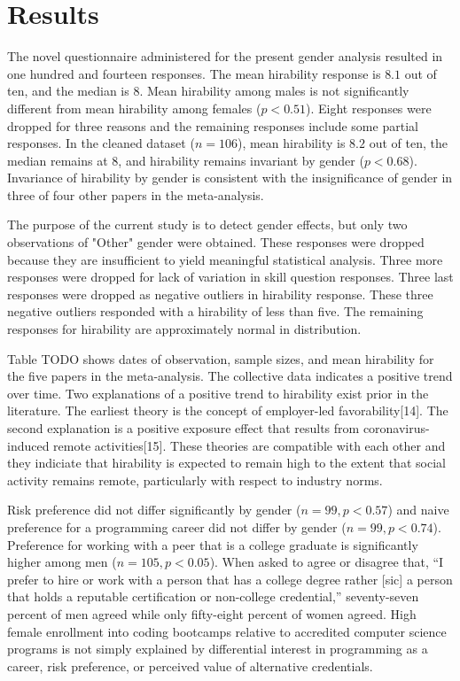 \documentclass[review]{elsarticle}
\begin{document}
\section{Results}

The novel questionnaire administered for the present gender analysis resulted in one hundred and fourteen responses.
The mean hirability response is $8.1$ out of ten, and the median is $8$.
Mean hirability among males is not significantly different from mean hirability among females ($p < 0.51$).
Eight responses were dropped for three reasons and the remaining responses include some partial responses.
In the cleaned dataset ($n = 106$), mean hirability is $8.2$ out of ten,
the median remains at $8$, and hirability remains invariant by gender ($p < 0.68$).
Invariance of hirability by gender is consistent with the insignificance of gender in three of four other papers in the meta-analysis.

The purpose of the current study is to detect gender effects, but only two observations of "Other" gender were obtained.
These responses were dropped because they are insufficient to yield meaningful statistical analysis.
Three more responses were dropped for lack of variation in skill question responses.
Three last responses were dropped as negative outliers in hirability response.
These three negative outliers responded with a hirability of less than five.
The remaining responses for hirability are approximately normal in distribution.

Table TODO shows dates of observation, sample sizes, and mean hirability for the five papers in the meta-analysis.
The collective data indicates a positive trend over time.
Two explanations of a positive trend to hirability exist prior in the literature.
The earliest theory is the concept of employer-led favorability[14].
The second explanation is a positive exposure effect that results from coronavirus-induced remote activities[15].
These theories are compatible with each other and they indiciate that hirability is expected to remain high
to the extent that social activity remains remote, particularly with respect to industry norms.

Risk preference did not differ significantly by gender ($n = 99, p < 0.57$)
and naive preference for a programming career did not differ by gender ($n = 99, p < 0.74$).
Preference for working with a peer that is a college graduate is significantly higher among men ($n = 105, p < 0.05$).
When asked to agree or disagree that, ``I prefer to hire or work with a person that has a college degree
rather [sic] a person that holds a reputable certification or non-college credential,''
seventy-seven percent of men agreed while only fifty-eight percent of women agreed.
High female enrollment into coding bootcamps
relative to accredited computer science programs is not simply explained
by differential interest in programming as a career,
risk preference,
or perceived value of alternative credentials.
\end{document}
